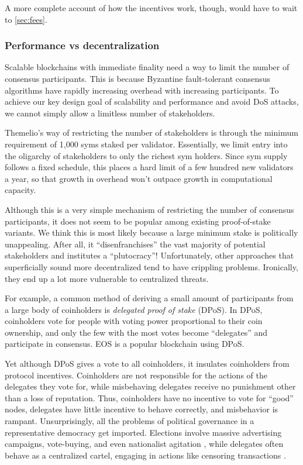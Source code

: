 \documentclass[letterpaper,12pt,oneside]{article}
\begin{document}
A more complete account of how the incentives work, though, would have to wait to \ref{sec:fees}.

\subsubsection{Performance vs decentralization}

Scalable blockchains with immediate finality need a way to limit the number of consensus participants. This is because Byzantine fault-tolerant consensus algorithms have rapidly increasing overhead with increasing participants. To achieve our key design goal of scalability and performance and avoid DoS attacks, we cannot simply allow a limitless number of stakeholders.

Themelio's way of restricting the number of stakeholders is through the minimum requirement of 1,000 syms staked per validator. Essentially, we limit entry into the oligarchy of stakeholders to only the richest sym holders. Since sym supply follows a fixed schedule, this places a hard limit of a few hundred new validators a year, so that growth in overhead won't outpace growth in computational capacity.


Although this is a very simple mechanism of restricting the number of consensus participants, it does not seem to be popular among existing proof-of-stake variants. We think this is most likely because a large minimum stake is politically unappealing. After all, it ``disenfranchises'' the vast majority of potential stakeholders and institutes a ``plutocracy''! Unfortunately, other approaches that superficially sound more decentralized tend to have crippling problems. Ironically, they end up a lot more vulnerable to centralized threats.

For example, a common method of deriving a small amount of participants from a large body of coinholders is \textit{delegated proof of stake} (DPoS). In DPoS, coinholders vote for people with voting power proportional to their coin ownership, and only the few with the most votes become ``delegates'' and participate in consensus. EOS is a popular blockchain using DPoS.

Yet although DPoS gives a vote to all coinholders, it insulates coinholders from protocol incentives. Coinholders are not responsible for the actions of the delegates they vote for, while misbehaving delegates receive no punishment other than a loss of reputation. Thus, coinholders have no incentive to vote for ``good'' nodes, delegates have little incentive to behave correctly, and misbehavior is rampant. Unsurprisingly, all the problems of political governance in a representative democracy get imported. Elections involve massive advertising campaigns, vote-buying, and even nationalist agitation \cite{zhihu2019votebuy}, while delegates often behave as a centralized cartel, engaging in actions like censoring transactions \cite{eoscensor}.
\end{document}
